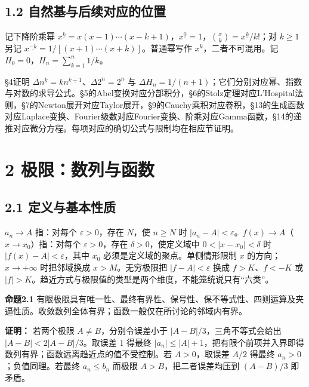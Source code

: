 \documentclass[11pt,a4paper]{article}
\begin{document}
\subsection{1.2
自然基与后续对应的位置}\label{ux81eaux7136ux57faux4e0eux540eux7eedux5bf9ux5e94ux7684ux4f4dux7f6e}

记下降阶乘幂
\(x^{\underline{k}}=x(x-1)\cdots(x-k+1)\)，\(x^{\underline0}=1\)，\(\binom{x}{k}=x^{\underline k}/k!\)；对
\(k\ge1\) 另记 \(x^{\underline{-k}}=1/[(x+1)\cdots(x+k)]\)。普通幂写作
\(x^k\)，二者不可混用。记 \(H_0=0\)，\(H_n=\sum_{k=1}^n1/k\)。

§4证明
\(\Delta n^{\underline k}=k n^{\underline{k-1}}\)、\(\Delta2^n=2^n\) 与
\(\Delta H_n=1/(n+1)\)；它们分别对应幂、指数与对数的求导公式。§5的Abel变换对应分部积分，§6的Stolz定理对应L'Hospital法则，§7的Newton展开对应Taylor展开，§9的Cauchy乘积对应卷积，§13的生成函数对应Laplace变换、Fourier级数对应Fourier变换、阶乘对应Gamma函数，§14的递推对应微分方程。每项对应的确切公式与限制均在相应节证明。

\clearpage

\section{2
极限：数列与函数}\label{ux6781ux9650ux6570ux5217ux4e0eux51fdux6570}

\subsection{2.1
定义与基本性质}\label{ux5b9aux4e49ux4e0eux57faux672cux6027ux8d28}

\(a_n\to A\) 指：对每个 \(\varepsilon>0\)，存在 \(N\)，使 \(n\ge N\) 时
\(|a_n-A|<\varepsilon\)。\(f(x)\to A\)（\(x\to x_0\)）指：对每个
\(\varepsilon>0\)，存在 \(\delta>0\)，使定义域中 \(0<|x-x_0|<\delta\) 时
\(|f(x)-A|<\varepsilon\)，其中 \(x_0\) 必须是定义域的聚点。单侧情形限制
\(x\) 的方向；\(x\to+\infty\) 时把邻域换成 \(x>M\)。无穷极限把
\(|f-A|<\varepsilon\) 换成 \(f>K\)、\(f<-K\) 或
\(|f|>K\)。趋近方式与极限值的类型是两个维度，不能笼统说只有``六类''。

\textbf{命题2.1}
有限极限具有唯一性、最终有界性、保号性、保不等式性、四则运算及夹逼性质。收敛数列全体有界；函数一般仅在所讨论的邻域内有界。

\textbf{证明：} 若两个极限 \(A\ne B\)，分别令误差小于
\(|A-B|/3\)，三角不等式会给出 \(|A-B|<2|A-B|/3\)。取误差 \(1\) 得最终
\(|a_n|\le |A|+1\)，把有限个前项并入界即得数列有界；函数远离趋近点的值不受控制。若
\(A>0\)，取误差 \(A/2\) 得最终 \(a_n>0\)；负值同理。若最终
\(a_n\le b_n\) 而极限 \(A>B\)，把二者误差均压到 \((A-B)/3\) 即矛盾。
\end{document}
